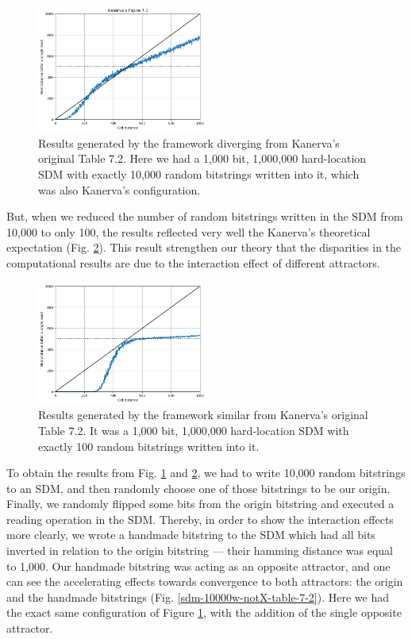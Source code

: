 \begin{figure}[h]
\centering\includegraphics[width=0.5\textwidth]{images02/sdm-10000w-table-7-2.png}
\caption{Results generated by the framework diverging from Kanerva's original Table 7.2. Here we had a 1,000 bit, 1,000,000 hard-location SDM with exactly 10,000 random bitstrings written into it, which was also Kanerva's configuration.
\label{sdm-10000w-table-7-2}}
\end{figure}

But, when we reduced the number of random bitstrings written in the SDM from 10,000 to only 100, the results reflected very well the Kanerva's theoretical expectation (Fig. \ref{sdm-100w-table-7-2}). This result strengthen our theory that the disparities in the computational results are due to the interaction effect of different attractors.

\begin{figure}[h]
\centering\includegraphics[width=0.5\textwidth]{images02/sdm-100w-table-7-2.png}
\caption{Results generated by the framework similar from Kanerva's original Table 7.2. It was a 1,000 bit, 1,000,000 hard-location SDM with exactly 100 random bitstrings written into it.
\label{sdm-100w-table-7-2}}
\end{figure}

To obtain the results from Fig. \ref{sdm-10000w-table-7-2} and \ref{sdm-100w-table-7-2}, we had to write 10,000 random bitstrings to an SDM, and then randomly choose one of those bitstrings to be our origin. Finally, we randomly flipped some bits from the origin bitstring and executed a reading operation in the SDM. Thereby, in order to show the interaction effects more clearly, we wrote a handmade bitstring to the SDM which had all bits inverted in relation to the origin bitstring --- their hamming distance was equal to 1,000. Our handmade bitstring was acting as an opposite attractor, and one can see the accelerating effects towards convergence to both attractors: the origin and the handmade bitstrings (Fig. \ref{sdm-10000w-notX-table-7-2}). Here we had the exact same configuration of Figure \ref{sdm-10000w-table-7-2}, with the addition of the single opposite attractor.

